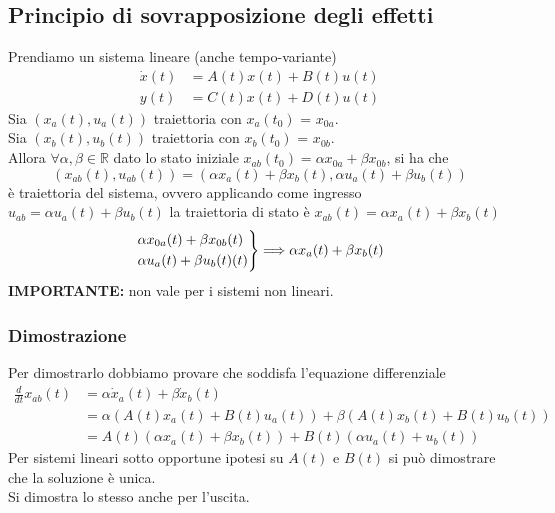 \documentclass{article}
\begin{document}
\subsection{Principio di sovrapposizione degli effetti}
Prendiamo un sistema lineare (anche tempo-variante)
\begin{align*}
    \dot x(t) &= A(t)x(t) + B(t)u(t)\\
    y(t) &= C(t)x(t) + D(t)u(t)
\end{align*}
Sia $(x_a (t), u_a (t))$ traiettoria con $x_a (t_0)$ = $x_{0a}$.\\
Sia $(x_b (t), u_b (t))$ traiettoria con $x_b (t_0)$ = $x_{0b}$.
\vspace*{0.1cm}\\
Allora $\forall \alpha, \beta \in \mathbb{R}$ dato lo stato iniziale $x_{ab}(t_0) = \alpha x_{0a}+\beta x_{0b}$, si ha che
\[
    (x_{ab}(t), u_{ab}(t)) = (\alpha x_{a}(t) + \beta x_b(t), \alpha u_a(t)+\beta u_b(t))
\]
è traiettoria del sistema, ovvero applicando come ingresso $u_{ab}=\alpha u_a(t) + \beta u_b(t)$ la traiettoria di stato è $x_{ab} (t) = \alpha x_a (t) + \beta x_b (t)$
\[
    \begin{rcases}
        \alpha x_{0a}(t)+\beta x_{0b}(t)\\
        \alpha u_a(t) + \beta u_b(t)(t)
    \end{rcases}
    \Longrightarrow
    \alpha x_a(t) + \beta x_b(t)
\]
\vspace*{0.2cm}
\textbf{IMPORTANTE:} non vale per i sistemi non lineari.

\subsubsection*{Dimostrazione}
Per dimostrarlo dobbiamo provare che soddisfa l'equazione differenziale
\begin{align*}
    \frac{d}{dt}x_{ab}(t) &= \alpha \dot x_a(t) + \beta \dot x_b(t)\\
    &= \alpha(A(t)x_a (t) + B(t)u_a (t)) + \beta (A(t)x_b (t) + B(t)u_b (t))\\
    &= A(t)(\alpha x_a (t) + \beta x_b (t)) + B(t)( \alpha u_a (t) + u_b (t))
\end{align*}
Per sistemi lineari sotto opportune ipotesi su $A(t)$ e $B(t)$ si può dimostrare che la soluzione è unica.\\
Si dimostra lo stesso anche per l'uscita.
\end{document}
